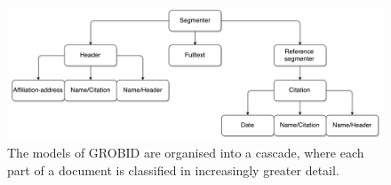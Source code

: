 \begin{figure}[!ht]
\center
\includegraphics[width=\textwidth]{Figures/cascade.pdf}
\caption{The models of GROBID are organised into a cascade, where each part of a document is classified in increasingly greater detail.}
\label{fig:cascade}
\end{figure}


